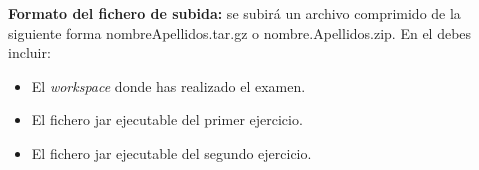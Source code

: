 \documentclass[addpoints,12pt]{exam}
\begin{document}
\textbf{Formato del fichero de subida:} se subirá un archivo comprimido de la siguiente forma nombreApellidos.tar.gz o nombre.Apellidos.zip. En el debes incluir:
\begin{itemize}
\item El \emph{workspace} donde has realizado el examen. 
\item El fichero jar ejecutable del primer ejercicio.
\item El fichero jar ejecutable del segundo ejercicio.
\end{itemize}
\end{document}
